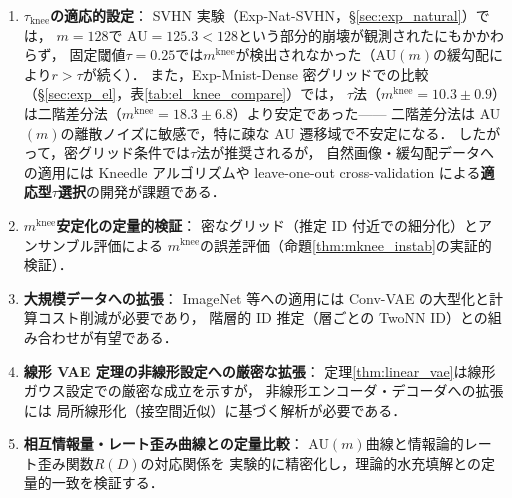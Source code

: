 \documentclass[11pt,a4paper]{jsarticle}
\newcommand{\mknee}{m^{\mathrm{knee}}}
\begin{document}
\begin{enumerate}
  \item \textbf{$\tau_{\mathrm{knee}}$の適応的設定}：
        SVHN 実験（Exp-Nat-SVHN，§\ref{sec:exp_natural}）では，
        $m = 128$で AU$= 125.3 < 128$という部分的崩壊が観測されたにもかかわらず，
        固定閾値$\tau = 0.25$では$\mknee$が検出されなかった（AU$(m)$の緩勾配により$r > \tau$が続く）．
        また，Exp-Mnist-Dense 密グリッドでの比較（§\ref{sec:exp_el}，表\ref{tab:el_knee_compare}）では，
        $\tau$法（$\mknee=10.3\pm0.9$）は二階差分法（$\mknee=18.3\pm6.8$）より安定であった——
        二階差分法は AU$(m)$の離散ノイズに敏感で，特に疎な AU 遷移域で不安定になる．
        したがって，密グリッド条件では$\tau$法が推奨されるが，
        自然画像・緩勾配データへの適用には Kneedle アルゴリズムや
        leave-one-out cross-validation による\textbf{適応型$\tau$選択}の開発が課題である．
  \item \textbf{$\mknee$安定化の定量的検証}：
        密なグリッド（推定 ID 付近での細分化）とアンサンブル評価による
        $\mknee$の誤差評価（命題\ref{thm:mknee_instab}の実証的検証）．
  \item \textbf{大規模データへの拡張}：
        ImageNet 等への適用には Conv-VAE の大型化と計算コスト削減が必要であり，
        階層的 ID 推定（層ごとの TwoNN ID）との組み合わせが有望である．
  \item \textbf{線形 VAE 定理の非線形設定への厳密な拡張}：
        定理\ref{thm:linear_vae}は線形ガウス設定での厳密な成立を示すが，
        非線形エンコーダ・デコーダへの拡張には
        局所線形化（接空間近似）に基づく解析が必要である．
  \item \textbf{相互情報量・レート歪み曲線との定量比較}：
        AU$(m)$曲線と情報論的レート歪み関数$R(D)$の対応関係を
        実験的に精密化し，理論的水充填解との定量的一致を検証する．
\end{enumerate}
\end{document}

